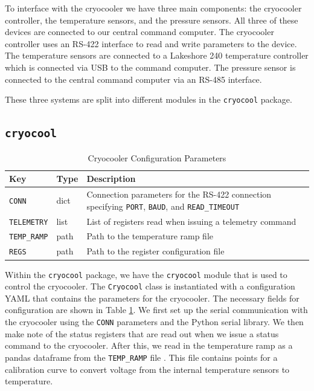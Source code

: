 To interface with the cryocooler we have three main components: the cryocooler controller, the temperature sensors, and the pressure sensors.
All three of these devices are connected to our central command computer. 
The cryocooler controller uses an RS-422 interface to read and write parameters to the device.
The temperature sensors are connected to a Lakeshore 240 temperature controller which is connected via USB to the command computer.
The pressure sensor is connected to the central command computer via an RS-485 interface.

These three systems are split into different modules in the \texttt{cryocool} package.

\subsection{\texttt{cryocool}}
\begin{table}[ht]
    \centering
    \begin{tabularx}{\textwidth}{l|l|X}
        \textbf{Key} & \textbf{Type} & \textbf{Description} \\ \hline    
        \texttt{CONN} & dict & Connection parameters for the RS-422 connection specifying \texttt{PORT}, \texttt{BAUD}, and \texttt{READ\_TIMEOUT} \\
        \texttt{TELEMETRY} & list & List of registers read when issuing a telemetry command \\
        \texttt{TEMP\_RAMP} & path & Path to the temperature ramp file \\
        \texttt{REGS} & path & Path to the register configuration file
    \end{tabularx}
    \label{readout/table:cryocool_config}
    \caption{Cryocooler Configuration Parameters}
\end{table}

Within the \texttt{cryocool} package, we have the \texttt{cryocool} module that is used to control the cryocooler.
The \texttt{Cryocool} class is instantiated with a configuration YAML that contains the parameters for the cryocooler. 
The necessary fields for configuration are shown in Table \ref{readout/table:cryocool_config}.
We first set up the serial communication with the cryocooler using the \texttt{CONN} parameters and the Python serial library.
We then make note of the status registers that are read out when we issue a status command to the cryocooler.
After this, we read in the temperature ramp as a pandas dataframe from the \texttt{TEMP\_RAMP} file \parencite{reback2020pandas}.
This file contains points for a calibration curve to convert voltage from the internal temperature sensors to temperature.

